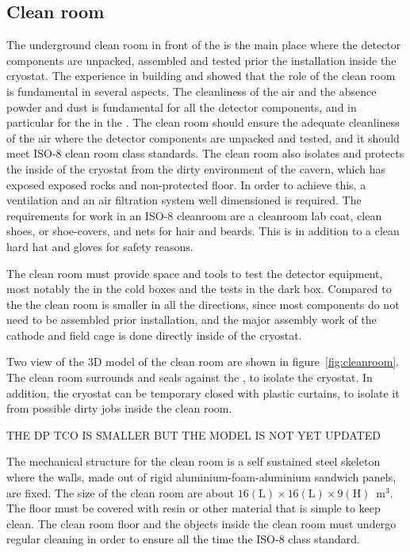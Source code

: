 \subsection{Clean room}
The underground clean room in front of the  is the main place where the detector components are unpacked, assembled and tested prior the installation inside the cryostat.
The experience in building  and  showed that the role of the clean room is fundamental in several aspects.
The cleanliness of the air and the absence powder and dust is fundamental for all the detector components, and in particular for the  in the .
The clean room should ensure the adequate cleanliness of the air where the detector components are unpacked and tested, and it should meet ISO-8 clean room class standards.
The clean room also isolates and protects the inside of the cryostat from the dirty environment of the cavern, which has exposed exposed rocks and non-protected floor.
In order to achieve this, a ventilation and an air filtration system well dimensioned is required.
The requirements for work in an ISO-8 cleanroom are a cleanroom lab coat, clean shoes, or shoe-covers, and nets for hair and beards.
This is in addition to a clean hard hat and gloves for safety reasons.

The clean room must provide space and tools to test the detector equipment, most notably the  in the cold boxes and the  tests in the dark box.
Compared to the  the clean room is smaller in all the directions, since most components do not need to be assembled prior installation, and the major assembly work of the cathode and field cage is done directly inside of the cryostat.

Two view of the 3D model of the clean room are shown in figure~\ref{fig:cleanroom}.
The clean room surrounds and seals against the , to isolate the cryostat.
In addition, the cryostat  can be temporary closed with plastic curtains, to isolate it from possible dirty jobs inside the clean room.

THE DP TCO IS SMALLER BUT THE MODEL IS NOT YET UPDATED

The mechanical structure for the clean room is a self sustained steel skeleton where the walls, made out of rigid aluminium-foam-aluminium sandwich panels, are fixed.
The size of the clean room are about $16 \mathrm{(L)} \times 16 \mathrm{(L)} \times 9 \mathrm{(H)}$~m$^3$.
The floor must be covered with resin or other material that is simple to keep clean.
The clean room floor and the objects inside the clean room must undergo regular cleaning in order to ensure all the time the ISO-8 class standard.

